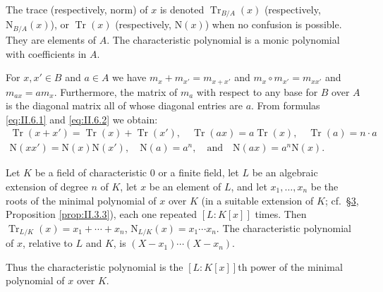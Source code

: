 The trace (respectively, norm) of $x$ is denoted
$\operatorname{Tr}_{B/A}(x)$ (respectively, $\mathrm{N}_{B/A}(x)$), or
$\operatorname{Tr}(x)$ (respectively, $\mathrm{N}(x)$) when no confusion is
possible. They are elements of $A$. The characteristic polynomial is a monic
polynomial with coefficients in $A$.

For $x,x'\in B$ and $a\in A$ we have $m_{x}+m_{x'}=m_{x+x'}$ and
$m_{x}\circ m_{x'}=m_{xx'}$ and $m_{ax}=am_{x}$. Furthermore, the matrix of
$m_{a}$ with respect to any base for $B$ over $A$ is the diagonal matrix all
of whose diagonal entries are $a$. From formulas \eqref{eq:II.6.1} and
\eqref{eq:II.6.2} we obtain:
\begin{equation}
\begin{gathered}
\operatorname{Tr}(x+x')=\operatorname{Tr}(x)+\operatorname{Tr}(x'),\quad
\operatorname{Tr}(ax)=a\operatorname{Tr}(x),\quad
\operatorname{Tr}(a)=n\cdot a\\
\mathrm{N}(xx')=\mathrm{N}(x)\mathrm{N}(x'),\quad \mathrm{N}(a)=a^{n},
\quad\text{and}\quad \mathrm{N}(ax)=a^{n}\mathrm{N}(x).
\end{gathered}
\label{eq:II.6.3}
\end{equation}

\begin{proposition}
\label{prop:II.6.1}
Let $K$ be a field of characteristic $0$ or a finite field, let $L$ be an
algebraic extension of degree $n$ of $K$, let $x$ be an element of $L$, and
let $x_{1},\ldots,x_{n}$ be the roots of the minimal polynomial of $x$ over
$K$ (in a suitable extension of $K$; cf.\ \hyperref[sec:2.3]{§3}, Proposition
\ref{prop:II.3.3}), each one repeated $[L:K[x]]$ times. Then
$\operatorname{Tr}_{L/K}(x)=x_{1}+\cdots+x_{n}$,
$\mathrm{N}_{L/K}(x)=x_{1}\cdots x_{n}$. The characteristic polynomial of
$x$, relative to $L$ and $K$, is $(X-x_{1})\cdots(X-x_{n})$.
\end{proposition}

Thus the characteristic polynomial is the $[L:K[x]]$th power of the minimal
polynomial of $x$ over $K$.

